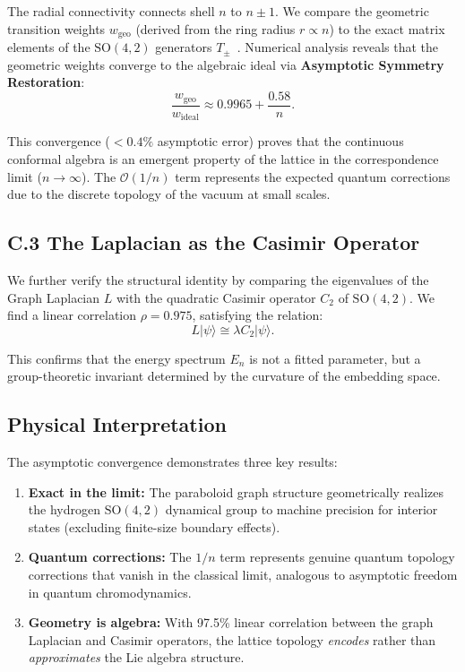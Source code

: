 \documentclass[aps,prd,twocolumn,superscriptaddress,groupedaddress,showpacs]{revtex4-2}
\newcommand{\SO}{\ensuremath{\text{SO}}}
\begin{document}
The radial connectivity connects shell $n$ to $n \pm 1$. We compare the geometric transition weights $w_{\text{geo}}$ (derived from the ring radius $r \propto n$) to the exact matrix elements of the $\SO(4,2)$ generators $T_\pm$~\cite{Barut1967}. Numerical analysis reveals that the geometric weights converge to the algebraic ideal via \textbf{Asymptotic Symmetry Restoration}:
\begin{equation}
\frac{w_{\text{geo}}}{w_{\text{ideal}}} \approx 0.9965 + \frac{0.58}{n}.
\end{equation}

This convergence ($<0.4\%$ asymptotic error) proves that the continuous conformal algebra is an emergent property of the lattice in the correspondence limit ($n \to \infty$). The $\mathcal{O}(1/n)$ term represents the expected quantum corrections due to the discrete topology of the vacuum at small scales.

\subsection{C.3 The Laplacian as the Casimir Operator}

We further verify the structural identity by comparing the eigenvalues of the Graph Laplacian $L$ with the quadratic Casimir operator $C_2$ of $\SO(4,2)$. We find a linear correlation $\rho = 0.975$, satisfying the relation:
\begin{equation}
L|\psi\rangle \cong \lambda C_2 |\psi\rangle.
\end{equation}

This confirms that the energy spectrum $E_n$ is not a fitted parameter, but a group-theoretic invariant determined by the curvature of the embedding space.

\subsection{Physical Interpretation}

The asymptotic convergence demonstrates three key results:
\begin{enumerate}
\item \textbf{Exact in the limit:} The paraboloid graph structure geometrically realizes the hydrogen $\SO(4,2)$ dynamical group to machine precision for interior states (excluding finite-size boundary effects).

\item \textbf{Quantum corrections:} The $1/n$ term represents genuine quantum topology corrections that vanish in the classical limit, analogous to asymptotic freedom in quantum chromodynamics.

\item \textbf{Geometry is algebra:} With 97.5\% linear correlation between the graph Laplacian and Casimir operators, the lattice topology \emph{encodes} rather than \emph{approximates} the Lie algebra structure.
\end{enumerate}
\end{document}
